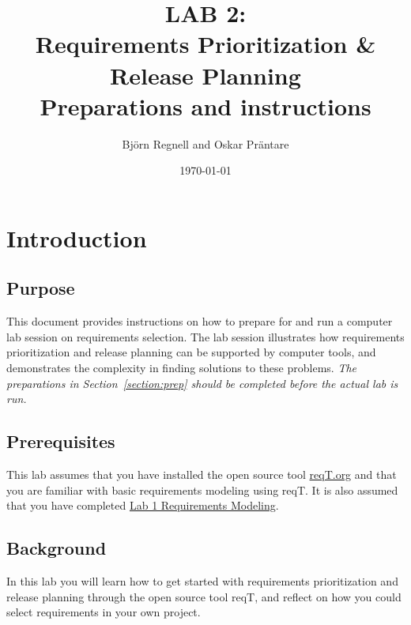 \documentclass[11pt]{article}
\title{{\bf LAB 2:\\Requirements Prioritization \& Release Planning}\\ Preparations and instructions}
\author{Björn Regnell and Oskar Präntare}
\date{\today}
\begin{document}
\maketitle

\section{Introduction}

\subsection{Purpose} This document provides instructions on how to prepare for and run a computer lab session on requirements selection. The lab session illustrates how requirements prioritization and release planning can be supported by computer tools, and demonstrates the complexity in finding solutions to these problems. {\it The preparations in Section~\ref{section:prep} should be completed before the actual lab is run.} 

\subsection{Prerequisites} This lab assumes that you have installed the open source tool \href{http://reqT.org}{reqT.org} and that you are familiar with basic requirements modeling using reqT. It is also assumed that you have completed \href{https://github.com/reqT/reqT/blob/3.0.x/doc/lab1/lab1.pdf}{Lab 1 Requirements Modeling}.

\subsection{Background} In this lab you will learn how to get started with requirements prioritization and release planning through the open source tool reqT, and reflect on how you could select requirements in your own project. 
\end{document}
